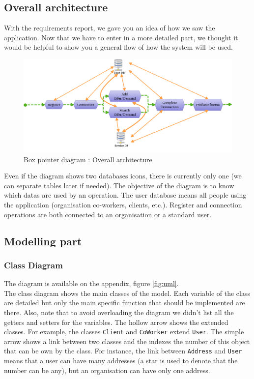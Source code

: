 \subsection{Overall architecture}
With the requirements report, we gave you an idea of how we saw the application. Now that we have to enter in a more detailed part, we thought it would be helpful to show you a general flow of how the system will be used. \\
\begin{figure} [H]
	\begin{center}
		\includegraphics[width=.9\textwidth]{boxpointer.png}
		\caption{Box pointer diagram : Overall architecture}
		\label{fig:overall}
	\end{center}
\end{figure}

Even if the diagram shows two databases icons, there is currently only one (we can separate tables later if needed). The objective of the diagram is to know which datas are used by an operation. The user database means all people using the application (organisation co-workers, clients, etc.). Register and connection operations are both connected to an organisation or a standard user.


\subsection{Modelling part} %

\subsubsection{Class Diagram} %
\label{uml}
The diagram is available on the appendix, figure \vref{fig:uml}.\\
The class diagram shows the main classes of the model. Each variable of the class are detailed but only the main specific function that should be implemented are there. Also, note that to avoid overloading the diagram we didn't list all the getters and setters for the variables. The hollow arrow shows the extended classes. For example, the classes \texttt{Client} and \texttt{CoWorker} extend \texttt{User}. The simple arrow shows a link between two classes and the indexes the number of this object that can be own by the class. For instance, the link between \texttt{Address} and \texttt{User} means that a user can have many addresses (a star is used to denote that the number can be any), but an organisation can have only one address.\\

